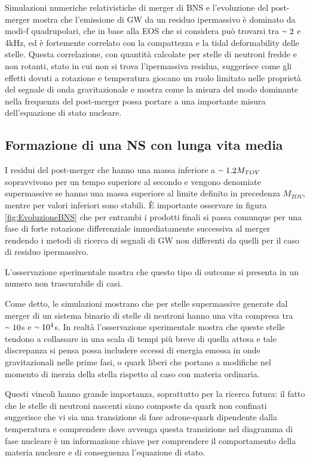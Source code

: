 Simulazioni numeriche relativistiche di merger di BNS e l'evoluzione del post-merger mostra che l'emissione di GW da un residuo ipermassivo è dominato da modi-f quadrupolari, che in base alla EOS che si considera può trovarsi tra $\smallsim2$ e 4kHz, ed è fortemente correlato con la compattezza e la tidal deformability delle stelle. Questa correlazione, con quantità calcolate per stelle di neutroni fredde e non rotanti, stato in cui non si trova l'ipermassiva residua, suggerisce come gli effetti dovuti a rotazione e temperatura giocano un ruolo limitato nelle proprietà del segnale di onda gravitazionale e mostra come la misura del modo dominante nella frequenza del post-merger possa portare a una importante misura dell'equazione di stato nucleare\cite{sarin2020evolution}.

\subsection{Formazione di una NS con lunga vita media}
\label{subsection:long_lived}
I residui del post-merger che hanno una massa inferiore a $\smallsim1.2M_{TOV}$ sopravvivono per un tempo superiore al secondo e vengono denomiate supermassive se hanno una massa superiore al limite definito in precedenza $M_{TOV}$, mentre per valori inferiori sono stabili.
È importante osservare in figura \ref{fig:EvoluzioneBNS} che per entrambi i prodotti finali si passa comunque per una fase di forte rotazione differenziale immediatamente successiva al merger rendendo i metodi di ricerca di segnali di GW non differenti da quelli per il caso di residuo ipermassivo.

L'osservazione sperimentale mostra che questo tipo di outcome si presenta in un numero non trascurabile di casi.

Come detto, le simulazioni mostrano che per stelle supermassive generate dal merger di un sistema binario di stelle di neutroni hanno una vita compresa tra $\smallsim10$s e $\smallsim10^4$s. In realtà l'osservazione sperimentale mostra che queste stelle tendono a collassare in una scala di tempi più breve di quella attesa e tale discrepanza si pensa possa includere eccessi di energia emessa in onde gravitazionali nelle prime fasi, o quark liberi che portano a modifiche nel momento di inerzia della stella rispetto al caso con materia ordinaria.

Questi vincoli hanno grande importanza, soprattutto per la ricerca futura: il fatto che le stelle di neutroni nascenti siano composte da quark non confinati suggerisce che vi sia una transizione di fase adrone-quark dipendente dalla temperatura e comprendere dove avvenga questa transizione nel diagramma di fase nucleare è un informazione chiave per comprendere il comportamento della materia nucleare e di conseguenza l'equazione di stato.

